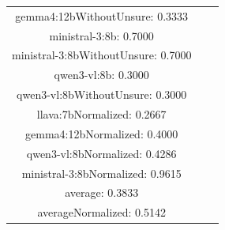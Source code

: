 \documentclass[a4paper]{article}
\begin{document}
\begin{tabular}{ccc}
gemma4:12bWithoutUnsure: 0.3333 \\ ministral-3:8b: 0.7000 \\ ministral-3:8bWithoutUnsure: 0.7000 \\ qwen3-vl:8b: 0.3000 \\ qwen3-vl:8bWithoutUnsure: 0.3000 \\ llava:7bNormalized: 0.2667 \\ gemma4:12bNormalized: 0.4000 \\ qwen3-vl:8bNormalized: 0.4286 \\ ministral-3:8bNormalized: 0.9615 \\ average: 0.3833 \\ averageNormalized: 0.5142 \end{minipage}\\
\end{tabular}

\vspace{5mm}
\end{document}
